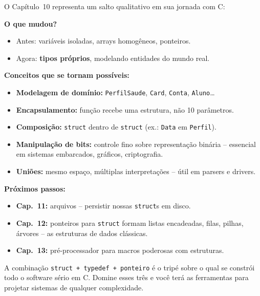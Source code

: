 \documentclass[12pt,a4paper]{article}
\begin{document}
\begin{tcolorbox}[colback=deitellightblue,colframe=deitelblue,
  title={\bfseries Da memória bruta aos tipos próprios}]

O Capítulo~10 representa um salto qualitativo em sua jornada com C:

\textbf{O que mudou?}
\begin{itemize}[noitemsep]
  \item Antes: variáveis isoladas, arrays homogêneos, ponteiros.
  \item Agora: \textbf{tipos próprios}, modelando entidades do mundo real.
\end{itemize}

\textbf{Conceitos que se tornam possíveis:}
\begin{itemize}[noitemsep]
  \item \textbf{Modelagem de domínio:} \texttt{PerfilSaude}, \texttt{Card},
  \texttt{Conta}, \texttt{Aluno}\ldots
  \item \textbf{Encapsulamento:} função recebe uma estrutura, não 10 parâmetros.
  \item \textbf{Composição:} \texttt{struct} dentro de \texttt{struct} (ex.: \texttt{Data} em \texttt{Perfil}).
  \item \textbf{Manipulação de bits:} controle fino sobre representação binária --
  essencial em sistemas embarcados, gráficos, criptografia.
  \item \textbf{Uniões:} mesmo espaço, múltiplas interpretações -- útil em parsers
  e drivers.
\end{itemize}

\textbf{Próximos passos:}
\begin{itemize}[noitemsep]
  \item \textbf{Cap.~11:} arquivos -- persistir nossas \texttt{struct}s em disco.
  \item \textbf{Cap.~12:} ponteiros para \texttt{struct} formam listas encadeadas,
  filas, pilhas, árvores -- as estruturas de dados clássicas.
  \item \textbf{Cap.~13:} pré-processador para macros poderosas com estruturas.
\end{itemize}

A combinação \texttt{struct + typedef + ponteiro} é o tripé sobre o qual se
constrói todo o software sério em C. Domine esses três e você terá as ferramentas
para projetar sistemas de qualquer complexidade.

\end{tcolorbox}
\end{document}

